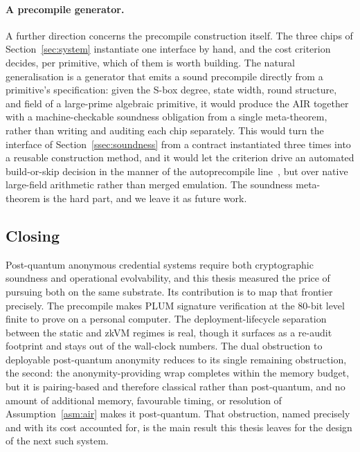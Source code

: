 \paragraph{A precompile generator.}
A further direction concerns the precompile construction itself. The three chips of Section~\ref{sec:system} instantiate one interface by hand, and the cost criterion decides, per primitive, which of them is worth building. The natural generalisation is a generator that emits a sound precompile directly from a primitive's specification: given the S-box degree, state width, round structure, and field of a large-prime algebraic primitive, it would produce the AIR together with a machine-checkable soundness obligation from a single meta-theorem, rather than writing and auditing each chip separately. This would turn the interface of Section~\ref{ssec:soundness} from a contract instantiated three times into a reusable construction method, and it would let the criterion drive an automated build-or-skip decision in the manner of the autoprecompile line~\cite{powdr2025autoprecompiles}, but over native large-field arithmetic rather than merged emulation. The soundness meta-theorem is the hard part, and we leave it as future work.

\subsection{Closing}\label{subsec:conclusion-closing}
Post-quantum anonymous credential systems require both cryptographic soundness and operational evolvability, and this thesis measured the price of pursuing both on the same substrate. Its contribution is to map that frontier precisely. The precompile makes PLUM signature verification at the $80$-bit level finite to prove on a personal computer. The deployment-lifecycle separation between the static and zkVM regimes is real, though it surfaces as a re-audit footprint and stays out of the wall-clock numbers. The dual obstruction to deployable post-quantum anonymity reduces to its single remaining obstruction, the second: the anonymity-providing wrap completes within the memory budget, but it is pairing-based and therefore classical rather than post-quantum, and no amount of additional memory, favourable timing, or resolution of Assumption~\ref{asm:air} makes it post-quantum. That obstruction, named precisely and with its cost accounted for, is the main result this thesis leaves for the design of the next such system.
